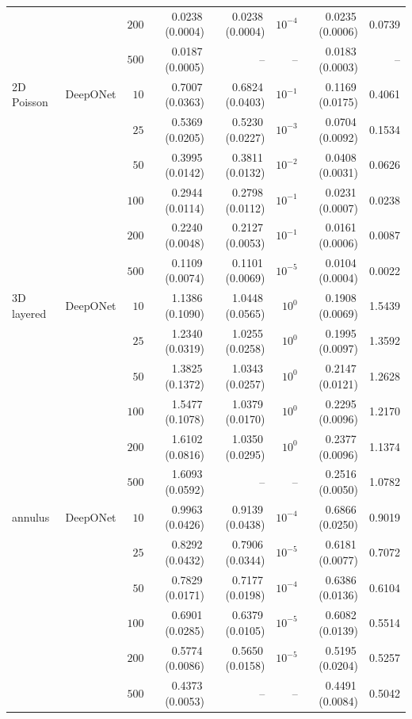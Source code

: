\documentclass{article}
\begin{document}
{\begin{longtable}{llrrrrrr}
 &  & $200$ & 0.0238\,(0.0004) & 0.0238\,(0.0004) & $10^{-4}$ & 0.0235\,(0.0006) & 0.0739\\
 &  & $500$ & 0.0187\,(0.0005) & -- & -- & 0.0183\,(0.0003) & --\\
2D Poisson & DeepONet & $10$ & 0.7007\,(0.0363) & 0.6824\,(0.0403) & $10^{-1}$ & 0.1169\,(0.0175) & 0.4061\\
 &  & $25$ & 0.5369\,(0.0205) & 0.5230\,(0.0227) & $10^{-3}$ & 0.0704\,(0.0092) & 0.1534\\
 &  & $50$ & 0.3995\,(0.0142) & 0.3811\,(0.0132) & $10^{-2}$ & 0.0408\,(0.0031) & 0.0626\\
 &  & $100$ & 0.2944\,(0.0114) & 0.2798\,(0.0112) & $10^{-1}$ & 0.0231\,(0.0007) & 0.0238\\
 &  & $200$ & 0.2240\,(0.0048) & 0.2127\,(0.0053) & $10^{-1}$ & 0.0161\,(0.0006) & 0.0087\\
 &  & $500$ & 0.1109\,(0.0074) & 0.1101\,(0.0069) & $10^{-5}$ & 0.0104\,(0.0004) & 0.0022\\
3D layered & DeepONet & $10$ & 1.1386\,(0.1090) & 1.0448\,(0.0565) & $10^{0}$ & 0.1908\,(0.0069) & 1.5439\\
 &  & $25$ & 1.2340\,(0.0319) & 1.0255\,(0.0258) & $10^{0}$ & 0.1995\,(0.0097) & 1.3592\\
 &  & $50$ & 1.3825\,(0.1372) & 1.0343\,(0.0257) & $10^{0}$ & 0.2147\,(0.0121) & 1.2628\\
 &  & $100$ & 1.5477\,(0.1078) & 1.0379\,(0.0170) & $10^{0}$ & 0.2295\,(0.0096) & 1.2170\\
 &  & $200$ & 1.6102\,(0.0816) & 1.0350\,(0.0295) & $10^{0}$ & 0.2377\,(0.0096) & 1.1374\\
 &  & $500$ & 1.6093\,(0.0592) & -- & -- & 0.2516\,(0.0050) & 1.0782\\
annulus & DeepONet & $10$ & 0.9963\,(0.0426) & 0.9139\,(0.0438) & $10^{-4}$ & 0.6866\,(0.0250) & 0.9019\\
 &  & $25$ & 0.8292\,(0.0432) & 0.7906\,(0.0344) & $10^{-5}$ & 0.6181\,(0.0077) & 0.7072\\
 &  & $50$ & 0.7829\,(0.0171) & 0.7177\,(0.0198) & $10^{-4}$ & 0.6386\,(0.0136) & 0.6104\\
 &  & $100$ & 0.6901\,(0.0285) & 0.6379\,(0.0105) & $10^{-5}$ & 0.6082\,(0.0139) & 0.5514\\
 &  & $200$ & 0.5774\,(0.0086) & 0.5650\,(0.0158) & $10^{-5}$ & 0.5195\,(0.0204) & 0.5257\\
 &  & $500$ & 0.4373\,(0.0053) & -- & -- & 0.4491\,(0.0084) & 0.5042\\

\end{longtable}}
\end{document}
